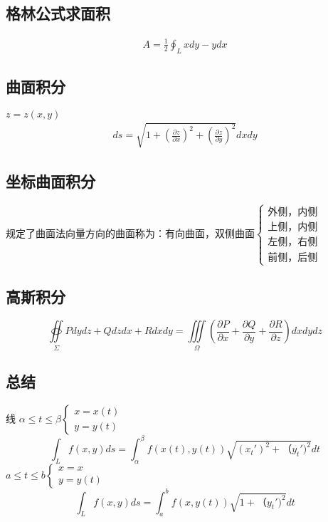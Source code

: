 	\subsection{格林公式求面积}
	\begin{align}
		A=\frac{1}{2}\oint_{L}xdy-ydx \label{Green's_formula_2}
	\end{align}
\subsection{曲面积分}
$z=z(x,y)$
\begin{align}
	ds=\sqrt{1+\left(\frac{\partial z}{\partial x}\right)^2+\left(\frac{\partial z}{\partial y}\right)^2}dxdy
\end{align}
\subsection{坐标曲面积分}
规定了曲面法向量方向的曲面称为：有向曲面，双侧曲面$\begin{cases}
	\mbox{外侧，内侧}\\
	\mbox{上侧，内侧}\\
	\mbox{左侧，右侧}\\
	\mbox{前侧，后侧}
\end{cases}$
\subsection{高斯积分}
$$\oiint\limits_{\Sigma}Pdydz+Qdzdx+Rdxdy=\iiint\limits_{\Omega}\left(\frac{\partial P}{\partial x}+\frac{\partial Q}{\partial y}+\frac{\partial R}{\partial z}\right)dxdydz$$
	
	\subsection{总结}
	线
	$\alpha\leqslant t\leqslant\beta\begin{cases}
		x=x(t)\\
		y=y(t)
	\end{cases}$
	$$\int_L f(x,y)ds=\int_\alpha^\beta f(x(t),y(t))\sqrt{(x_t')^2+（y_t')^2}dt$$
	$a\leqslant t\leqslant b\begin{cases}
	x=x\\
	y=y(t)
\end{cases}$	
		$$\int_L f(x,y)ds=\int_a^b f(x,y(t))\sqrt{1+（y_t')^2}dt$$
	
